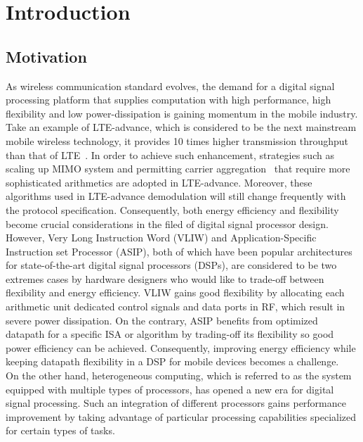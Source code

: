 \chapter{Introduction}

    \section{Motivation}
        As wireless communication standard evolves, the demand for a digital signal processing platform that supplies computation with high performance, high flexibility and low power-dissipation is gaining momentum in the mobile industry. 
        Take an example of LTE-advance, which is considered to be the next mainstream mobile wireless technology, it provides 10 times higher transmission throughput than that of LTE~\cite{lte}. 
        In order to achieve such enhancement, strategies such as scaling up MIMO system and permitting carrier aggregation~\cite{carrier} that require more sophisticated arithmetics are adopted in LTE-advance.
        Moreover, these algorithms used in LTE-advance demodulation will still change frequently with the protocol specification.
        Consequently, both energy efficiency and flexibility become crucial considerations in the filed of digital signal processor design. 
        However, Very Long Instruction Word (VLIW) and Application-Specific Instruction set Processor (ASIP), both of which have been popular architectures for state-of-the-art digital signal processors (DSPs), are considered to be two extremes cases by hardware designers who would like to trade-off between flexibility and energy efficiency. 
        VLIW gains good flexibility by allocating each arithmetic unit dedicated control signals and data ports in RF, which result in severe power dissipation. %
        On the contrary, ASIP benefits from optimized datapath for a specific ISA or algorithm by trading-off its flexibility so good power efficiency can be achieved. 
        Consequently, improving energy efficiency while keeping datapath flexibility in a DSP for mobile devices becomes a challenge.	
        \\\indent 
        On the other hand, heterogeneous computing, which is referred to as the system equipped with multiple types of processors, has opened a new era for digital signal processing. 
        Such an integration of different processors gains performance improvement by taking advantage of particular processing capabilities specialized for certain types of tasks.
